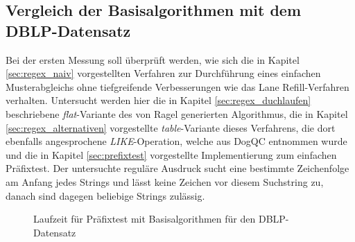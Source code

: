\subsection{Vergleich der Basisalgorithmen mit dem DBLP-Datensatz}

Bei der ersten Messung soll überprüft werden, wie sich die in Kapitel \ref{sec:regex_naiv} vorgestellten Verfahren zur Durchführung eines einfachen Musterabgleichs ohne tiefgreifende Verbesserungen wie das Lane Refill-Verfahren verhalten.
Untersucht werden hier die in Kapitel \ref{sec:regex_duchlaufen} beschriebene \emph{flat}-Variante des von Ragel generierten Algorithmus, die in Kapitel \ref{sec:regex_alternativen} vorgestellte \emph{table}-Variante dieses Verfahrens, die dort ebenfalls angesprochene \emph{LIKE}-Operation, welche aus DogQC entnommen wurde und die in Kapitel \ref{sec:prefixtest} vorgestellte Implementierung zum einfachen Präfixtest.
Der untersuchte reguläre Ausdruck sucht eine bestimmte Zeichenfolge am Anfang jedes Strings und lässt keine Zeichen vor diesem Suchstring zu, danach sind dagegen beliebige Strings zulässig. 

\begin{figure}[ht]
	\centering
	\caption{Laufzeit für Präfixtest mit Basisalgorithmen für den DBLP-Datensatz}
	\label{fig:regex_dblpANY_no_buffer}
\end{figure}

